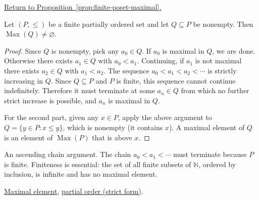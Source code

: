 
\newpage
{}
\label{prf:finite-poset-maximal}

\begin{remark*}[Return]
\hyperref[prop:finite-poset-maximal]{Return to Proposition~\ref*{prop:finite-poset-maximal}.}
\end{remark*}

\begin{theorem*}
Let $(P, \leq)$ be a finite partially ordered set and let $Q \subseteq P$
be nonempty.  Then $\operatorname{Max}(Q) \neq \varnothing$.
\end{theorem*}

\begin{proof}[Proof]
Since $Q$ is nonempty, pick any $a_0 \in Q$.  If $a_0$ is maximal in $Q$,
we are done.  Otherwise there exists $a_1 \in Q$ with $a_0 < a_1$.
Continuing, if $a_1$ is not maximal there exists $a_2 \in Q$ with
$a_1 < a_2$.  The sequence $a_0 < a_1 < a_2 < \cdots$ is strictly
increasing in $Q$.  Since $Q \subseteq P$ and $P$ is finite, this sequence
cannot continue indefinitely.  Therefore it must terminate at some
$a_n \in Q$ from which no further strict increase is possible, and $a_n$
is maximal in $Q$.

For the second part, given any $x \in P$, apply the above argument to
$Q = \{y \in P : x \leq y\}$, which is nonempty (it contains $x$).  A
maximal element of $Q$ is an element of $\operatorname{Max}(P)$ that is
above $x$.
\end{proof}

\begin{remark*}
An ascending chain argument.  The chain $a_0 < a_1 < \cdots$ must
terminate because $P$ is finite.  Finiteness is essential: the set of
all finite subsets of $\mathbb{N}$, ordered by inclusion, is infinite
and has no maximal element.
\end{remark*}

\begin{remark*}[Dependencies]
\hyperref[def:maximal-element]{Maximal element},
\hyperref[def:lattice-order-partial-order]{partial order (strict form)}.
\end{remark*}
